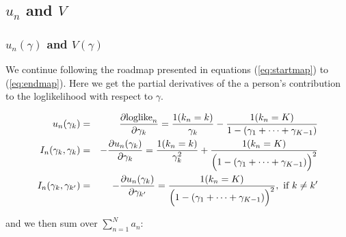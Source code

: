 \documentclass[11pt]{article}
\begin{document}
\subsection{$u_n$ and $V$}

\subsubsection{$u_n(\gamma)$ and $V(\gamma)$}

We continue following the roadmap presented in equations
(\ref{eq:startmap}) to (\ref{eq:endmap}).  Here we get the partial derivatives of 
the a person's contribution to the loglikelihood with respect to $\gamma$.

\begin{eqnarray}
u_n(\gamma_{k}) & = & 
                    \frac{\partial \mbox{loglike}_n}{\partial
                   \gamma_{k}} = \frac{1(k_n=k)}{\gamma_k} - 
                    \frac{1(k_n=K)}{1-(\gamma_1 + \cdots
                      +\gamma_{K-1})} \\
I_n(\gamma_{k},\gamma_{k}) & = & 
                   -\frac{\partial u_n(\gamma_k)}{\partial
                    \gamma_{k}} = \frac{1(k_n=k)}{\gamma_k^2} +
                    \frac{1(k_n=K)}{\Bigl(1-(\gamma_1 + \cdots
                      +\gamma_{K-1})\Bigr)^2} \\
I_n(\gamma_{k},\gamma_{k'}) & = & -\frac{\partial u_n(\gamma_k)}{\partial
                      \gamma_{k'}} = 
                      \frac{1(k_n=K)}{\Bigl(1-(\gamma_1 + \cdots +\gamma_{K-1})\Bigr)^2}, 
                       \mbox{ if } k \neq k'
\end{eqnarray}

and we then sum over $\sum_{n=1}^N a_n$:
\end{document}
